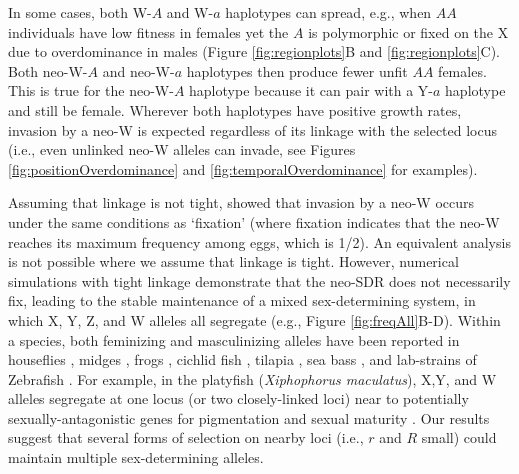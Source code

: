 \documentclass[12pt]{article}
\begin{document}
In some cases, both W-$A$ and W-$a$ haplotypes can spread, e.g., when $AA$ individuals have low fitness in females yet the $A$ is polymorphic or fixed on the X due to overdominance in males (Figure \ref{fig:regionplots}B and \ref{fig:regionplots}C).
Both neo-W-$A$ and neo-W-$a$ haplotypes then produce fewer unfit $AA$ females.
This is true for the neo-W-$A$ haplotype because it can pair with a Y-$a$ haplotype and still be female. 
Wherever both haplotypes have positive growth rates, invasion by a neo-W is expected regardless of its linkage with the selected locus (i.e., even unlinked neo-W alleles can invade, see Figures \ref{fig:positionOverdominance} and \ref{fig:temporalOverdominance} for examples). 

Assuming that linkage is not tight, \citet{vanDoorn:2010hu} showed that invasion by a neo-W occurs under the same conditions as `fixation' (where fixation indicates that the neo-W reaches its maximum frequency among eggs, which is 1/2). 
An equivalent analysis is not possible where we assume that linkage is tight. 
However, numerical simulations with tight linkage demonstrate that the neo-SDR does not necessarily fix, leading to the stable maintenance of a mixed sex-determining system, in which X, Y, Z, and W alleles all segregate (e.g., Figure \ref{fig:freqAll}B-D). 
Within a species, both feminizing and masculinizing alleles have been reported in houseflies \citep{Macdonald1978}, midges \citep{Thompson1971}, frogs \citep{Ogata:2007jm}, cichlid fish \citep{Ser:2010iq}, tilapia \citep{Lee2004}, sea bass \citep{Vandeputte2007}, and lab-strains of Zebrafish \citep{Liew2012,Wilson2014}. 
For example, in the platyfish (\textit{Xiphophorus maculatus}), X,Y, and W alleles segregate at one locus (or two closely-linked loci) near to potentially sexually-antagonistic genes for pigmentation and sexual maturity \citep{Kallman1965,Kallman1968, Volff2001, Schultheis2006}. 
Our results suggest that several forms of selection on nearby loci (i.e., $r$ and $R$ small) could maintain multiple sex-determining alleles. 

 
\end{document}
